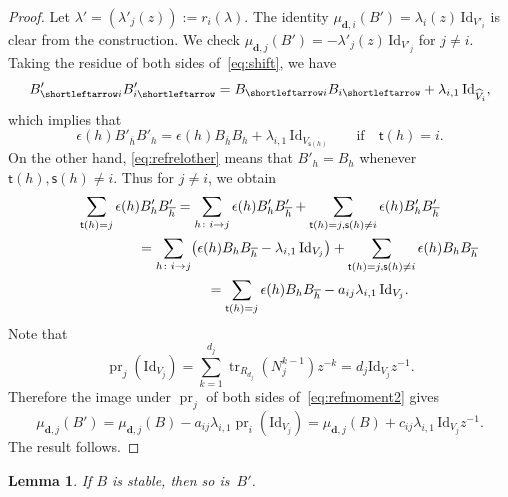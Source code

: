 \documentclass[pdftex]{sigma}
\newcommand{\slar}{\shortleftarrow}
\numberwithin{equation}{section}
\newtheorem{Lemma}[Theorem]{Lemma}
\theoremstyle{definition}
\newcommand{\tr}{\operatorname{tr}}
\newcommand{\unit}{\mathrm{Id}}
\newcommand{\prj}{\operatorname{pr}}
\newcommand{\ov}{\overline}
\newcommand{\ved}{\mathbf{d}}
\newcommand{\vin}{\mathsf{t}} %
\newcommand{\vout}{\mathsf{s}} %
\begin{document}
\begin{proof}
Let $\lambda'=(\lambda'_j(z)) := r_i(\lambda)$.
The identity $\mu_{\ved,i}(B')=\lambda_i(z)\,\unit_{V'_i}$
is clear from the construction.
We check $\mu_{\ved,j}(B')=-\lambda'_j(z)\,\unit_{V'_j}$ for $j \neq i$.
Taking the residue of both sides of~\eqref{eq:shift}, we have
\[
 B'_{\slar i} B'_{i \slar} =  B_{\slar i} B_{i \slar}
+ \lambda_{i,1}\,\unit_{\widehat{V}_i},
\]
which implies that
\[
\epsilon(h) B'_{\ov{h}} B'_h = \epsilon(h) B_{\ov{h}} B_h
+ \lambda_{i,1}\, \unit_{V_{\vout(h)}} \qquad
\text{if} \quad \vin(h)=i.
\]
On the other hand, \eqref{eq:refrelother} means that
$B'_h = B_h$ whenever $\vin(h), \vout(h) \neq i$.
Thus for $j \neq i$, we obtain
\begin{gather}
\sum_{\vin(h)=j} \epsilon(h) B'_h B'_{\ov{h}}
 = \sum_{h \colon i \to j} \epsilon(h) B'_h B'_{\ov{h}} +
\sum_{\vin(h)=j, \vout(h) \neq i} \epsilon(h) B'_h B'_{\ov{h}} \notag\\
\hphantom{\sum_{\vin(h)=j} \epsilon(h) B'_h B'_{\ov{h}}}{}
= \sum_{h \colon i \to j}
\bigl( \epsilon(h) B_h B_{\ov{h}} - \lambda_{i,1}\,\unit_{V_j} \bigr)
+\sum_{\vin(h)=j, \vout(h) \neq i} \epsilon(h) B_h B_{\ov{h}} \notag\\
\hphantom{\sum_{\vin(h)=j} \epsilon(h) B'_h B'_{\ov{h}}}{}
=\sum_{\vin(h)=j} \epsilon(h) B_h B_{\ov{h}}
- a_{ij}\lambda_{i,1}\,\unit_{V_j}.\label{eq:refmoment2}
\end{gather}
Note that
\[
\prj_j(\unit_{V_j}) = \sum_{k=1}^{d_j} \tr_{R_{d_j}} (N_j^{k-1}) z^{-k}
= d_j \unit_{V_j} z^{-1}.
\]
Therefore the image under $\prj_j$
of both sides of~\eqref{eq:refmoment2} gives
\[
\mu_{\ved,j}(B') = \mu_{\ved,j}(B)
- a_{ij}\lambda_{i,1} \prj_i(\unit_{V_j})
=\mu_{\ved,j}(B)
+ c_{ij}\lambda_{i,1}\,\unit_{V_j}z^{-1}.
\]
The result follows.
\end{proof}

\begin{Lemma}\label{lem:refirred}
If $B$ is stable, then so is~$B'$.
\end{Lemma}
\end{document}
